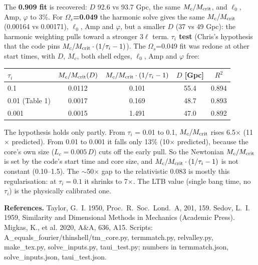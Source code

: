 \documentclass[10pt]{article}
\begin{document}
{The \textbf{0.909 fit} is recovered: $D$ 92.6 vs 93.7 Gpc, the same $M_c/M_{\rm crit}$, and $\ell_0$, Amp, $\varphi$ to 3\%. For \textbf{$\Omega_s$=0.049} the harmonic solve gives the same $M_c/M_{\rm crit}$ (0.00164 vs 0.00171), $\ell_0$, Amp and $\varphi$, but a smaller $D$ (37 vs 49 Gpc): the harmonic weighting pulls toward a stronger $3\ell$ term.
\textbf{$\tau_i$ test} (Chris's hypothesis that the code pins $M_c/M_{\rm crit}\cdot(1/\tau_i-1)$). The $\Omega_s$=0.049 fit was redone at other start times, with $D$, $M_c$, both shell edges, $\ell_0$, Amp and $\varphi$ free:
\begin{center}\footnotesize\begin{tabular}{lcccc}\toprule
$\tau_i$ & $M_c/M_{\rm crit}(D)$ & $M_c/M_{\rm crit}\cdot(1/\tau_i-1)$ & $D$ [Gpc] & $R^2$\\\midrule
0.1 & 0.0112 & 0.101 & 55.4 & 0.894\\
0.01 (Table 1) & 0.0017 & 0.169 & 48.7 & 0.893\\
0.001 & 0.0015 & 1.491 & 47.0 & 0.892\\\bottomrule
\end{tabular}\end{center}
\vspace{-3pt}
The hypothesis holds only partly. From $\tau_i$ = 0.01 to 0.1, $M_c/M_{\rm crit}$ rises 6.5$\times$ (11$\times$ predicted). From 0.01 to 0.001 it falls only 13\% (10$\times$ predicted), because the core's own size ($L_c=0.005\,D$) cuts off the early pull. So the Newtonian $M_c/M_{\rm crit}$ is set by the code's start time and core size, and $M_c/M_{\rm crit}\cdot(1/\tau_i-1)$ is not constant (0.10--1.5). The $\sim$50$\times$ gap to the relativistic 0.083 is mostly this regularisation: at $\tau_i=0.1$ it shrinks to 7$\times$. The LTB value (single bang time, no $\tau_i$) is the physically calibrated one.

{\footnotesize\textbf{References.} Taylor, G.~I. 1950, Proc.\ R.\ Soc.\ Lond.\ A, 201, 159. Sedov, L.~I. 1959, Similarity and Dimensional Methods in Mechanics (Academic Press). Migkas, K., et al. 2020, A\&A, 636, A15. Scripts: A\_equals\_fourier/thinshell/tm\_core.py, termmatch.py, relvalley.py, make\_tex.py, solve\_inputs.py, taui\_test.py; numbers in termmatch.json, solve\_inputs.json, taui\_test.json.}
}
\end{document}
